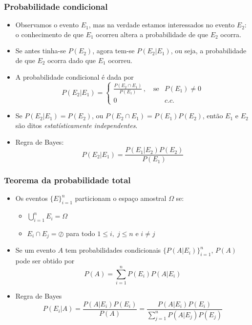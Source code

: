 \begin{frame}
    \frametitle{Probabilidade condicional}
    
    \begin{itemize}
      \item Observamos o evento $E_1$, mas na verdade estamos interessados no evento $E_2$: o conhecimento de que $E_1$ ocorreu altera a probabilidade de que $E_2$ ocorra.
      \item Se antes tinha-se $P(E_2)$, agora tem-se $P(E_2 | E_1)$, ou seja, a probabilidade de que $E_2$ ocorra dado que $E_1$ ocorreu.
      \item A probabilidade condicional é dada por
      \begin{equation}
	  P(E_2 | E_1) = \begin{cases}
			    \frac{P(E_2 \cap E_1)}{P(E_1)} \, , \quad \textrm{se} & P(E_1) \neq 0 \\
			     0 & c.c.
	                 \end{cases}
      \end{equation}

      \item Se $P(E_2| E_1) = P(E_2)$, ou $P(E_2 \cap E_1) = P(E_1) P(E_2)$, então $E_1$ e $E_2$ são ditos \textit{estatísticamente independentes}. 
      \item Regra de Bayes:
	\begin{equation}
	    P(E_2 | E_1) = \frac{P(E_1 | E_2) P(E_2)}{P(E_1)}
	\end{equation}
    \end{itemize}
\end{frame}


\begin{frame}
    \frametitle{Teorema da probabilidade total}
    
    \begin{itemize}
      \item Os eventos $\{E\}_{i=1}^n$ particionam o espaço amostral $\Omega$ se:
      \begin{itemize}
       \item $\bigcup\limits_{i=1}^n E_i = \Omega$
	\item $E_i \cap E_j = \oslash$ para todo $1 \leq i, \; j \leq n$ e $i \neq j$
      \end{itemize}
      \item Se um evento $A$ tem probabilidades condicionais $\{P(A|E_i)\}_{i=1}^n$, $P(A)$ pode ser obtido por
      \begin{equation}
	  P(A) = \sum\limits_{i=1}^n P(E_i) P(A | E_i)
      \end{equation}
      \item Regra de Bayes
      \begin{equation}
	  P(E_i | A) = \frac{P(A | E_i) P(E_i)}{P(A)} = \frac{P(A | E_i) P(E_i)}{\sum\limits_{j=1}^n P(A | E_j) P(E_j)}
      \end{equation}

    \end{itemize}
\end{frame}

